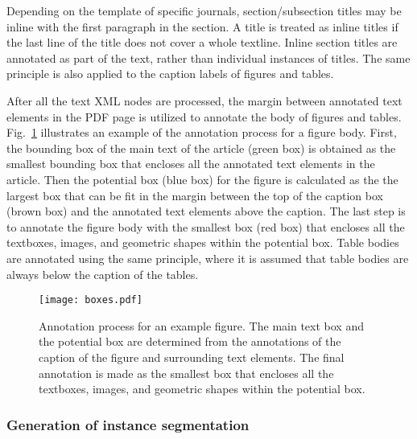 \documentclass[conference]{IEEEtran}
\begin{document}
Depending on the template of specific journals, section/subsection titles may be inline with the first paragraph in the section. A title is treated as inline titles if the last line of the title does not cover a whole textline. Inline section titles are annotated as part of the text, rather than individual instances of titles. The same principle is also applied to the caption labels of figures and tables.


After all the text XML nodes are processed, the margin between annotated text elements in the PDF page is utilized to annotate the body of figures and tables. Fig.~\ref{fig:box} illustrates an example of the annotation process for a figure body. First, the bounding box of the main text of the article (green box) is obtained as the smallest bounding box that encloses all the annotated text elements in the article. Then the potential box (blue box) for the figure is calculated as the the largest box that can be fit in the margin between the top of the caption box (brown box) and the annotated text elements above the caption. The last step is to annotate the figure body with the smallest box (red box) that encloses all the textboxes, images, and geometric shapes within the potential box. Table bodies are annotated using the same principle, where it is assumed that table bodies are always below the caption of the tables.
\begin{figure}[!htb]
  \centering
  \texttt{[image: boxes.pdf]}
  \caption{Annotation process for an example figure. The main text box and the potential box are determined from the annotations of the caption of the figure and surrounding text elements. The final annotation is made as the smallest box that encloses all the textboxes, images, and geometric shapes within the potential box.}
  \label{fig:box}
\end{figure}

\subsubsection{Generation of instance segmentation}
\end{document}
